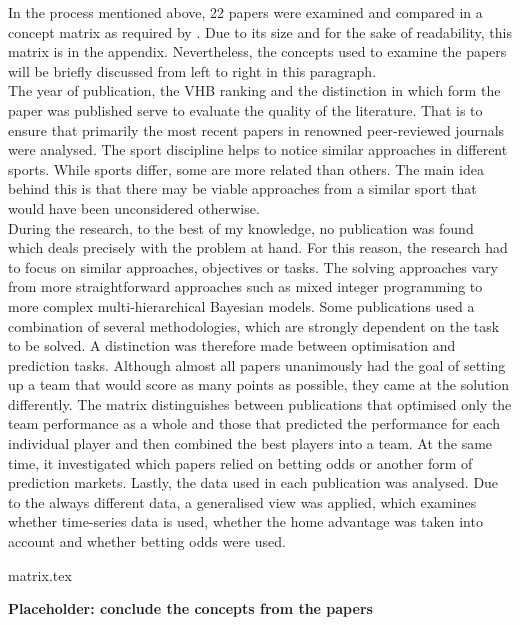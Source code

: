 In the process mentioned above, 22 papers were examined and compared in a concept matrix as required by \citet{webster_guest_2002}. Due to its size and for the sake of readability, this matrix is in the appendix. Nevertheless, the concepts used to examine the papers will be briefly discussed from left to right in this paragraph. \\
\indent The year of publication, the VHB ranking and the distinction in which form the paper was published serve to evaluate the quality of the literature. That is to ensure that primarily the most recent papers in renowned peer-reviewed journals were analysed. The sport discipline helps to notice similar approaches in different sports. While sports differ, some are more related than others. The main idea behind this is that there may be viable approaches from a similar sport that would have been unconsidered otherwise.  \\
\indent During the research, to the best of my knowledge, no publication was found which deals precisely with the problem at hand. For this reason, the research had to focus on similar approaches, objectives or tasks. The solving approaches vary from more straightforward approaches such as mixed integer programming to more complex multi-hierarchical Bayesian models. Some publications used a combination of several methodologies, which are strongly dependent on the task to be solved. A distinction was therefore made between optimisation and prediction tasks. Although almost all papers unanimously had the goal of setting up a team that would score as many points as possible, they came at the solution differently. The matrix distinguishes between publications that optimised only the team performance as a whole and those that predicted the performance for each individual player and then combined the best players into a team. At the same time, it investigated which papers relied on betting odds or another form of prediction markets. Lastly, the data used in each publication was analysed. Due to the always different data, a generalised view was applied, which examines whether time-series data is used, whether the home advantage was taken into account and whether betting odds were used.

{matrix.tex}

\textbf{Placeholder: conclude the concepts from the papers}

